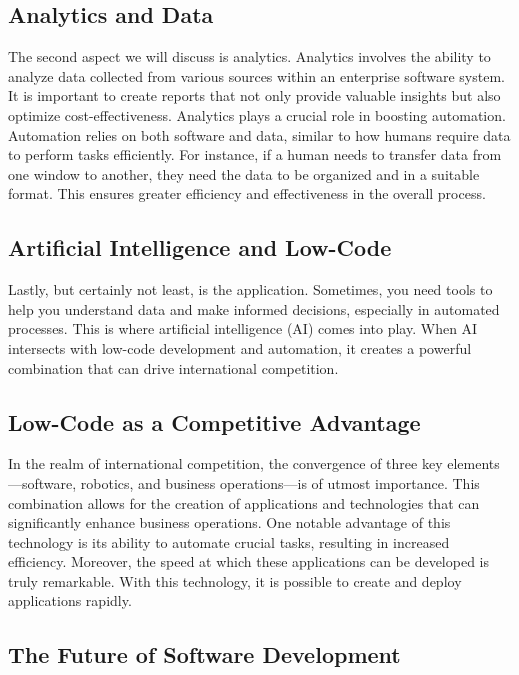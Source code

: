 \subsection{Analytics and Data}\label{analytics-and-data}

The second aspect we will discuss is analytics. Analytics involves the
ability to analyze data collected from various sources within an
enterprise software system. It is important to create reports that not
only provide valuable insights but also optimize cost-effectiveness.
Analytics plays a crucial role in boosting automation. Automation relies
on both software and data, similar to how humans require data to perform
tasks efficiently. For instance, if a human needs to transfer data from
one window to another, they need the data to be organized and in a
suitable format. This ensures greater efficiency and effectiveness in
the overall process.

\subsection{Artificial Intelligence and
    Low-Code}\label{artificial-intelligence-and-low-code}

Lastly, but certainly not least, is the
application. Sometimes, you need tools to help you understand data and
make informed decisions, especially in automated processes. This is
where artificial intelligence (AI) comes into play. When AI intersects
with low-code development and automation, it creates a powerful
combination that can drive international competition.

\subsection{Low-Code as a Competitive
    Advantage}\label{low-code-as-a-competitive-advantage}

In the realm of international competition, the convergence of three key
elements---software, robotics, and business operations---is of utmost
importance. This combination allows for the creation of applications and
technologies that can significantly enhance business operations. One
notable advantage of this technology is its ability to automate crucial
tasks, resulting in increased efficiency. Moreover, the speed at which
these applications can be developed is truly remarkable. With this
technology, it is possible to create and deploy applications rapidly.

\subsection{The Future of Software
    Development}\label{the-future-of-software-development}

